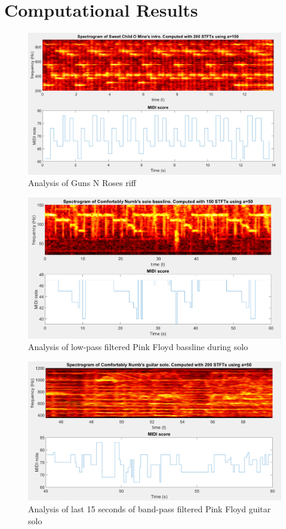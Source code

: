 \documentclass{article}
\begin{document}
\section{Computational Results}

\begin{figure}[!h]
	\centering
	\includegraphics[width=\linewidth]{score_1}    	
	\caption{Analysis of Guns N Roses riff}
	\label{fig:spect2}
\end{figure}


\begin{figure}[!h]
	\centering
	\includegraphics[width=\linewidth]{score_2}    	
	\caption{Analysis of low-pass filtered Pink Floyd bassline during solo}
	\label{fig:spect2}
\end{figure}

\begin{figure}[!t]
	\centering
	\includegraphics[width=\linewidth]{score_3}    	
	\caption{Analysis of last 15 seconds of band-pass filtered Pink Floyd guitar solo}
	\label{fig:spect2}
\end{figure}
\end{document}
